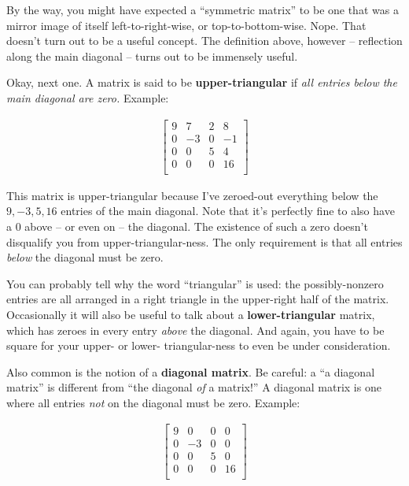 By the way, you might have expected a ``symmetric matrix'' to be one that was a
mirror image of itself left-to-right-wise, or top-to-bottom-wise. Nope. That
doesn't turn out to be a useful concept. The definition above, however --
reflection along the main diagonal -- turns out to be immensely useful.

\medskip

Okay, next one. A matrix is said to be \textbf{upper-triangular} if \textit{all
entries below the main diagonal are zero.} Example:

\vspace{-.15in}
\begin{align*}
\begin{bmatrix}
9 & 7 & 2 & 8\\
0 & -3 & 0 & -1\\
0 & 0 & 5 & 4 \\
0 & 0 & 0 & 16 \\
\end{bmatrix}
\end{align*}
\vspace{-.15in}

This matrix is upper-triangular because I've zeroed-out everything below the
$9,-3,5,16$ entries of the main diagonal. Note that it's perfectly fine to also
have a 0 above -- or even on -- the diagonal. The existence of such a zero
doesn't disqualify you from upper-triangular-ness. The only requirement is that
all entries \textit{below} the diagonal must be zero.


You can probably tell why the word ``triangular'' is used: the possibly-nonzero
entries are all arranged in a right triangle in the upper-right half of the
matrix. Occasionally it will also be useful to talk about a
\textbf{lower-triangular} matrix, which has zeroes in every entry
\textit{above} the diagonal. And again, you have to be square for your upper-
or lower- triangular-ness to even be under consideration.

\medskip


Also common is the notion of a \textbf{diagonal matrix}. Be careful: a ``a
diagonal matrix'' is different from ``the diagonal \textit{of} a matrix!'' A
diagonal matrix is one where all entries \textit{not} on the diagonal must be
zero. Example:

\vspace{-.15in}
\begin{align*}
\begin{bmatrix}
9 & 0 & 0 & 0\\
0 & -3 & 0 & 0\\
0 & 0 & 5 & 0 \\
0 & 0 & 0 & 16 \\
\end{bmatrix}
\end{align*}
\vspace{-.15in}

